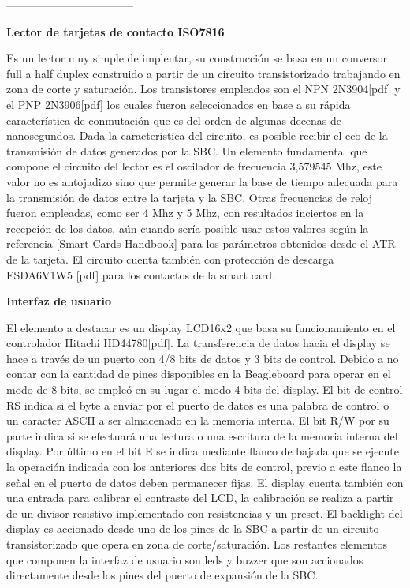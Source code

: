 \bigskip
-----------------------------------
\bigskip

{\bf{Lector de tarjetas de contacto ISO7816}}

Es un lector muy simple de implentar, su construcción se basa en un conversor full a half duplex construido a partir de un circuito transistorizado trabajando en zona de corte y saturación. Los transistores empleados son el NPN 2N3904[pdf] y el PNP 2N3906[pdf] los cuales fueron seleccionados en base a su rápida característica de conmutación que es del orden de algunas decenas de nanosegundos. Dada la característica del circuito, es posible recibir el eco de la transmisión de datos generados por la SBC. 
Un elemento fundamental que compone el circuito del lector es el oscilador de frecuencia 3,579545 Mhz, este valor no es antojadizo sino que permite generar la base de tiempo adecuada para la transmisión de datos entre la tarjeta y la SBC. Otras frecuencias de reloj fueron empleadas, como ser 4 Mhz y 5 Mhz, con resultados inciertos en la recepción de los datos, aún cuando sería posible usar estos valores según la referencia [Smart Cards Handbook] para los parámetros obtenidos desde el ATR de la tarjeta. 
El circuito cuenta también con protección de descarga ESDA6V1W5 [pdf] para los contactos de la smart card.

\bigskip
\bigskip
{\bf{Interfaz de usuario}}

El elemento a destacar es un display LCD16x2 que basa su funcionamiento en el controlador Hitachi HD44780[pdf]. La transferencia de datos hacia el display se hace a través de un puerto con 4/8 bits de datos y 3 bits de control. Debido a no contar con la cantidad de pines disponibles en la Beagleboard para operar en el modo de 8 bits, se empleó en su lugar el modo 4 bits del display. El bit de control RS indica si el byte a enviar por el puerto de datos es una palabra de control o un caracter ASCII a ser almacenado en la memoria interna. El bit R/W por su parte indica si se efectuará una lectura o una escritura de la memoria interna del display. Por último en el bit E se indica mediante flanco de bajada que se ejecute la operación indicada con los anteriores dos bits de control, previo a este flanco la señal en el puerto de datos deben permanecer fijas.
El display cuenta también con una entrada para calibrar el contraste del LCD, la calibración se realiza a partir de un divisor resistivo implementado con resistencias y un preset.
El backlight del display es accionado desde uno de los pines de la SBC a partir de un circuito transistorizado que opera en zona de corte/saturación.
Los restantes elementos que componen la interfaz de usuario son leds y buzzer que son accionados directamente desde los pines del puerto de expansión de la SBC.

